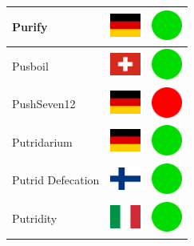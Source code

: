 \documentclass[12pt, a4paper, twoside]{report}
\begin{document}
\begin{center}
\begin{longtable}{|p{5cm}|p{2cm}|p{2cm}|}
 Purify                                                     & \includegraphics[width=1cm]{../img/flags/de} &   \includegraphics[width=1cm]{../likes/y} \\ \hline
 Pusboil                                                    & \includegraphics[width=1cm]{../img/flags/ch} &   \includegraphics[width=1cm]{../likes/y} \\ \hline
 PushSeven12                                                & \includegraphics[width=1cm]{../img/flags/de} &   \includegraphics[width=1cm]{../likes/n} \\ \hline
 Putridarium                                                & \includegraphics[width=1cm]{../img/flags/de} &   \includegraphics[width=1cm]{../likes/y} \\ \hline
 Putrid Defecation                                          & \includegraphics[width=1cm]{../img/flags/fi} &   \includegraphics[width=1cm]{../likes/y} \\ \hline
 Putridity                                                  & \includegraphics[width=1cm]{../img/flags/it} &   \includegraphics[width=1cm]{../likes/y} \\ \hline

\end{longtable}
\end{center}
\end{document}
